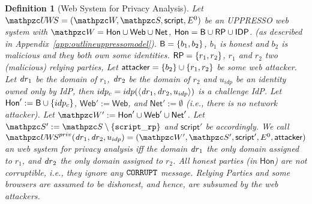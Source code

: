 \documentclass[letterpaper,onecolumn,10pt]{article}
\newtheorem{definition}{Definition}
\begin{document}
\begin{definition}[\uppresso Web System for Privacy Analysis]\label{def:uppresso-ws-priv}
  Let $\uppressowebsystem = (\bidsystem, \scriptset, 
  \mathsf{script}, E^0)$ be an UPPRESSO web system with 
  $\bidsystem = \mathsf{Hon} \cup \mathsf{Web} \cup 
  \mathsf{Net}$, 
  $\mathsf{Hon} = \mathsf{B} \cup \mathsf{RP} \cup \mathsf{IDP}$.
  (as described in Appendix~\ref{app:outlineuppressomodel}).
  $\mathsf{B} = \{b_1,b_2\}$, $b_1$ is honest and $b_2$ is 
  malicious and they both own some identities. 
  $\mathsf{RP} = \{r_1,r_2\}$, $r_1$ and $r_2$ two (malicious) 
  relying parties, 
  Let $\mathsf{attacker} = \{b_2\} \cup \{r_1,r_2\}$ be some 
  web attacker.
  Let $\mathit{dr}_1$ be the domain of $r_1$, $\mathit{dr}_2$ be the 
  domain of $r_2$ and $u_{idp}$ be an identity owned only by
  IdP, then $idp_c = idp(\langle {{}\mathit{dr}_1, \mathit{dr}_2, 
  u_{idp}} \rangle)$ is a challenge IdP. 
  Let $\mathsf{Hon}' := \mathsf{B} \cup \{idp_c\}$, 
  $\mathsf{Web}' := \mathsf{Web}$, 
  and $\mathsf{Net}' := \emptyset$ 
  (i.e., there is no network attacker).
  Let $\bidsystem' := \mathsf{Hon}' \cup \mathsf{Web}' \cup 
  \mathsf{Net}'$.  
  Let $\scriptset' := \scriptset \setminus 
  \{\str{script\_rp}\}$ and $\mathsf{script}'$ be accordingly.
  We call $\uppressoprivwebsystem(\mi{dr}_1, \mi{dr}_2, 
  u_{idp}) = (\bidsystem', \scriptset', \mathsf{script}', 
  E^0, \fAP{attacker})$ an \emph{\uppresso web system for 
  privacy analysis} 
  iff the domain $\mathit{dr}_1$ the only domain assigned to 
  $r_1$, and $\mathit{dr}_2$ the only domain assigned to $r_2$. 
  All honest parties (in $\mathsf{Hon}$) are not corruptible, 
  i.e., they ignore any $\mathtt{CORRUPT}$ message. Relying 
  Parties and some browsers are assumed to be dishonest, 
  and hence, are subsumed by the web attackers.
\end{definition}



\end{document}
